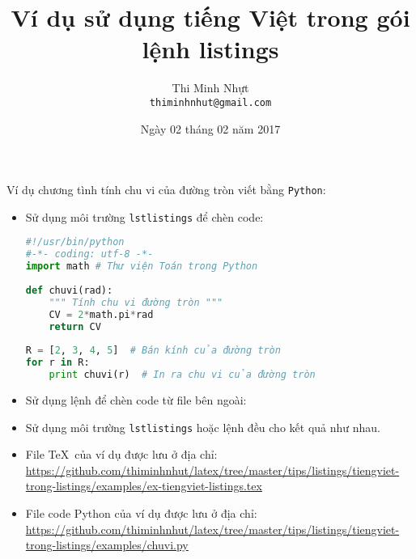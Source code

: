 \documentclass[12pt, a4paper]{article}
\title{\bfseries Ví dụ sử dụng tiếng Việt trong gói lệnh listings}
\author{Thi Minh Nhựt \bigskip \\ \tt{thiminhnhut@gmail.com}}
\date{Ngày 02 tháng 02 năm 2017}
\begin{document}
\maketitle

Ví dụ chương tình tính chu vi của đường tròn viết bằng \verb|Python|:
\begin{itemize}
	\item Sử dụng môi trường \verb|lstlistings| để chèn code:
\begin{lstlisting}[language=Python]
#!/usr/bin/python
#-*- coding: utf-8 -*-
import math # Thư viện Toán trong Python
  
def chuvi(rad):
	""" Tính chu vi đường tròn """
	CV = 2*math.pi*rad
	return CV
  	
R = [2, 3, 4, 5]  # Bán kính của đường tròn   
for r in R:
	print chuvi(r)	# In ra chu vi của đường tròn
\end{lstlisting}

	\item Sử dụng lệnh \verb|| để chèn code từ file bên ngoài: 
	
	\item Sử dụng môi trường \verb|lstlistings| hoặc lệnh \verb|| đều cho kết quả như nhau.
	
	\item File \TeX\ của ví dụ được lưu ở địa chỉ: \url{https://github.com/thiminhnhut/latex/tree/master/tips/listings/tiengviet-trong-listings/examples/ex-tiengviet-listings.tex}
	
	\item File code Python của ví dụ được lưu ở địa chỉ: \url{https://github.com/thiminhnhut/latex/tree/master/tips/listings/tiengviet-trong-listings/examples/chuvi.py}
\end{itemize}
\end{document}
